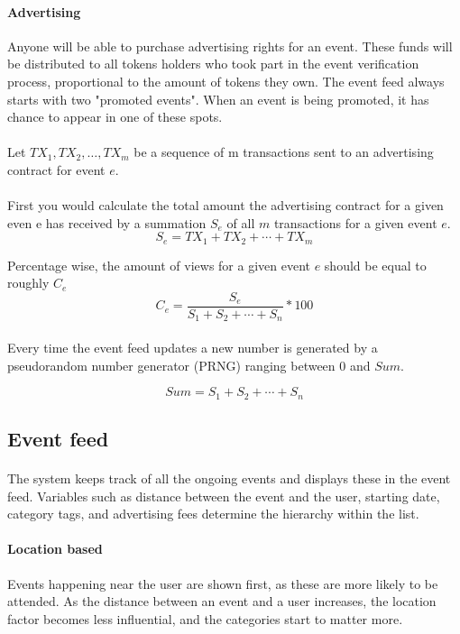 \documentclass[a4paper]{article}
\begin{document}
\paragraph{Advertising}
Anyone will be able to purchase advertising rights for an event. These funds will be distributed to all tokens holders who took part in the event verification process, proportional to the amount of tokens they own. The event feed always starts with two "promoted events". When an event is being promoted, it has chance to appear in one of these spots.

\paragraph{} Let $TX_1, TX_2, \ldots, TX_m$ be a sequence of m transactions sent to an advertising contract for event $e$.

\paragraph{}First you would calculate the total amount the advertising contract for a given even e has received by a summation $S_e$ of all $m$ transactions for a given event $e$.
\[S_e = TX_1 + TX_2 + \cdots + TX_m\]

Percentage wise, the amount of views for a given event $e$ should be equal to roughly $C_e$
\[C_e = \frac{S_e}{S_1 + S_2 + \cdots + S_n}*100\]

\paragraph{}
Every time the event feed updates a new number is generated by a pseudorandom number generator (PRNG) ranging between 0 and $Sum$. 

\[Sum = S_1 + S_2 + \cdots + S_n\]

\subsection{Event feed}
\paragraph{}The system keeps track of all the ongoing events and displays these in the event feed. Variables such as distance between the event and the user, starting date, category tags, and advertising fees determine the hierarchy within the list. 

\paragraph{Location based} Events happening near the user are shown first, as these are more likely to be attended. As the distance between an event and a user increases, the location factor becomes less influential, and the categories start to matter more.
\end{document}
